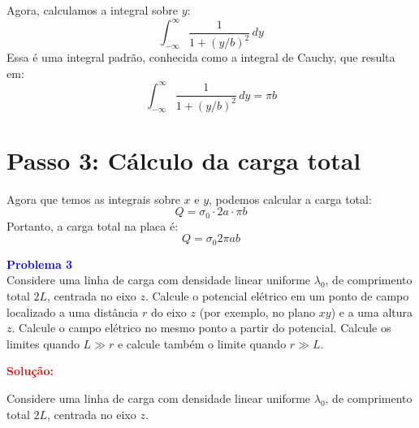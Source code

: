\documentclass[a4paper,12pt]{article}
\begin{document}
Agora, calculamos a integral sobre \(y\):
\begin{equation}
\int_{-\infty}^{\infty} \frac{1}{1 + (y/b)^2} \, dy
\end{equation}
Essa é uma integral padrão, conhecida como a integral de Cauchy, que resulta em:
\begin{equation}
\int_{-\infty}^{\infty} \frac{1}{1 + (y/b)^2} \, dy = \pi b
\end{equation}

\section*{Passo 3: Cálculo da carga total}

Agora que temos as integrais sobre \(x\) e \(y\), podemos calcular a carga total:
\begin{equation}
Q = \sigma_0 \cdot 2a \cdot \pi b
\end{equation}
Portanto, a carga total na placa é:
\begin{equation}
\boxed{Q = \sigma_0 2\pi a b }
\end{equation}

\begin{flushleft}
\textbf{\textcolor{blue}{\Large Problema 3}}\\
Considere uma linha de carga com densidade linear uniforme \( \lambda_0 \), de comprimento 
total \( 2L \), centrada no eixo \( z \). Calcule o potencial elétrico em um ponto de campo 
localizado a uma distância \( r \) do eixo \( z \) (por exemplo, no plano \( xy \)) e a uma 
altura \( z \). Calcule o campo elétrico no mesmo ponto a partir do potencial. Calcule os limites 
quando \( L \gg r \) e calcule também o limite quando \( r \gg L \).

\textcolor{red}{\textbf{Solução:}}\\
\end{flushleft}

Considere uma linha de carga com densidade linear uniforme \( \lambda_0 \), de comprimento total \( 2L \), 
centrada no eixo \( z \).
\end{document}
